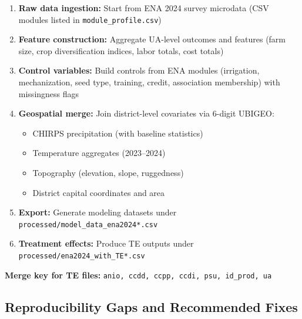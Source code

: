 \documentclass[11pt,a4paper]{article}
\begin{document}
\begin{enumerate}[leftmargin=1.5em]
    \item \textbf{Raw data ingestion:} Start from ENA 2024 survey microdata (CSV modules listed in \texttt{module\_profile.csv})
    
    \item \textbf{Feature construction:} Aggregate UA-level outcomes and features (farm size, crop diversification indices, labor totals, cost totals)
    
    \item \textbf{Control variables:} Build controls from ENA modules (irrigation, mechanization, seed type, training, credit, association membership) with missingness flags
    
    \item \textbf{Geospatial merge:} Join district-level covariates via 6-digit UBIGEO:
    \begin{itemize}
        \item CHIRPS precipitation (with baseline statistics)
        \item Temperature aggregates (2023--2024)
        \item Topography (elevation, slope, ruggedness)
        \item District capital coordinates and area
    \end{itemize}
    
    \item \textbf{Export:} Generate modeling datasets under \texttt{processed/model\_data\_ena2024*.csv}
    
    \item \textbf{Treatment effects:} Produce TE outputs under \texttt{processed/ena2024\_with\_TE*.csv}
\end{enumerate}

\textbf{Merge key for TE files:} \texttt{anio, ccdd, ccpp, ccdi, psu, id\_prod, ua}

\subsection{Reproducibility Gaps and Recommended Fixes}
\end{document}
